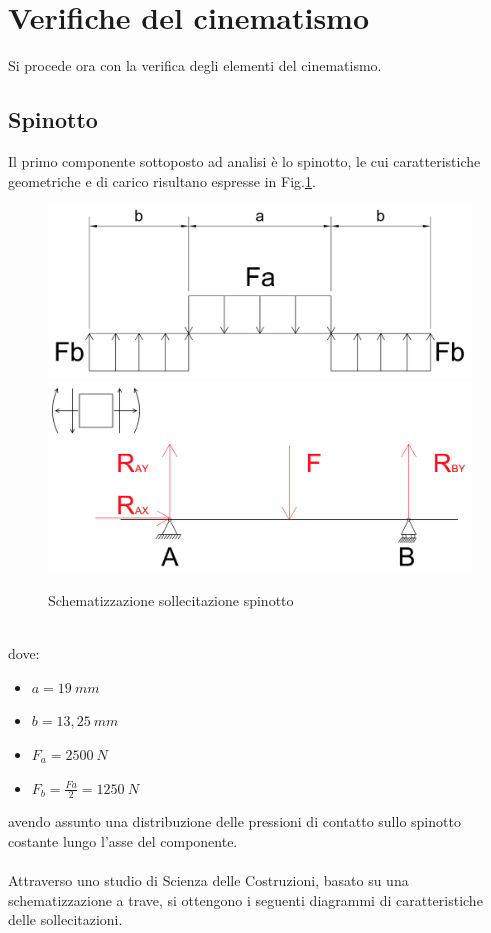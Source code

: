 \section{Verifiche del cinematismo}
Si procede ora con la verifica degli elementi del cinematismo.
\subsection{Spinotto}
Il primo componente sottoposto ad analisi è lo spinotto, le cui caratteristiche geometriche e di carico risultano espresse in Fig.\ref{fig:CarichiSpinotto}.\\
\begin{figure}[h]
\centering
   {\includegraphics[width=.48\textwidth]{Immagini/CarichiSpinotto1.png}} \quad
   {\includegraphics[width=.48\textwidth]{Immagini/CarichiSpinotto2.png}}
\caption{Schematizzazione sollecitazione spinotto}
\label{fig:CarichiSpinotto}
\end{figure}
\\
dove:
\begin{itemize}
    \item $a=19\ mm$
    \item $b=13,25\ mm$
    \item $F_a=2500\ N$
    \item $F_b=\frac{Fa}{2}=1250\ N$
\end{itemize}
avendo assunto una distribuzione delle pressioni di contatto sullo spinotto costante lungo l'asse del componente.\\
\\
Attraverso uno studio di Scienza delle Costruzioni, basato su una schematizzazione a trave, si ottengono i seguenti diagrammi di caratteristiche delle sollecitazioni.
